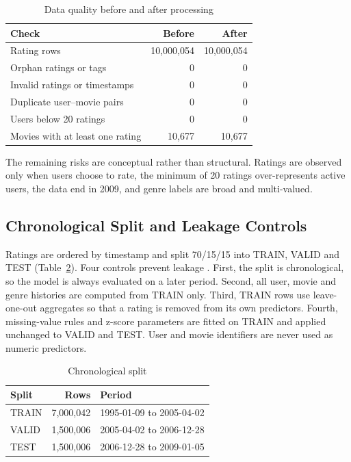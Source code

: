 \documentclass[conference]{IEEEtran}
\begin{document}
\begin{table}[htbp]
\caption{Data quality before and after processing}
\label{tab:dq}
\centering
\begin{tabular}{@{}lrr@{}}
\toprule
Check & Before & After \\
\midrule
Rating rows & 10,000,054 & 10,000,054 \\
Orphan ratings or tags & 0 & 0 \\
Invalid ratings or timestamps & 0 & 0 \\
Duplicate user--movie pairs & 0 & 0 \\
Users below 20 ratings & 0 & 0 \\
Movies with at least one rating & 10,677 & 10,677 \\
\bottomrule
\end{tabular}
\end{table}

The remaining risks are conceptual rather than structural. Ratings are observed only when users choose to rate, the minimum of 20 ratings over-represents active users, the data end in 2009, and genre labels are broad and multi-valued.

\subsection{Chronological Split and Leakage Controls}
Ratings are ordered by timestamp and split 70/15/15 into TRAIN, VALID and TEST (Table~\ref{tab:split}). Four controls prevent leakage \cite{b10}. First, the split is chronological, so the model is always evaluated on a later period. Second, all user, movie and genre histories are computed from TRAIN only. Third, TRAIN rows use leave-one-out aggregates so that a rating is removed from its own predictors. Fourth, missing-value rules and z-score parameters are fitted on TRAIN and applied unchanged to VALID and TEST. User and movie identifiers are never used as numeric predictors.

\begin{table}[htbp]
\caption{Chronological split}
\label{tab:split}
\centering
\begin{tabular}{@{}lrl@{}}
\toprule
Split & Rows & Period \\
\midrule
TRAIN & 7,000,042 & 1995-01-09 to 2005-04-02 \\
VALID & 1,500,006 & 2005-04-02 to 2006-12-28 \\
TEST & 1,500,006 & 2006-12-28 to 2009-01-05 \\
\bottomrule
\end{tabular}
\end{table}
\end{document}
